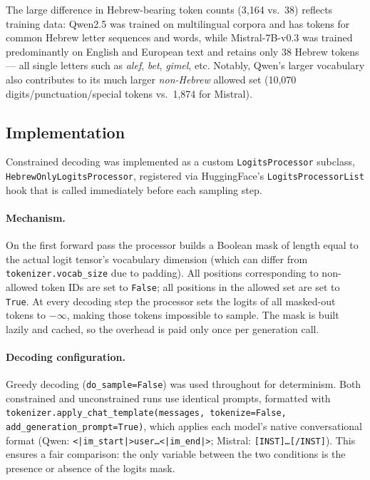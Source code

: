 \documentclass[11pt, a4paper]{article}
\begin{document}
The large difference in Hebrew-bearing token counts (3,164 vs.\ 38) reflects
training data: Qwen2.5 was trained on multilingual corpora and has tokens for
common Hebrew letter sequences and words, while Mistral-7B-v0.3 was trained
predominantly on English and European text and retains only 38 Hebrew tokens ---
all single letters such as \textit{alef}, \textit{bet}, \textit{gimel}, etc.
Notably, Qwen's larger vocabulary also contributes to its much larger
\emph{non-Hebrew} allowed set (10,070 digits/punctuation/special tokens vs.\
1,874 for Mistral).

\subsection{Implementation}

Constrained decoding was implemented as a custom \texttt{LogitsProcessor} subclass,
\texttt{HebrewOnlyLogitsProcessor}, registered via HuggingFace's
\texttt{LogitsProcessorList} hook that is called immediately before each
sampling step.

\paragraph{Mechanism.}
On the first forward pass the processor builds a Boolean mask of length equal to
the actual logit tensor's vocabulary dimension (which can differ from
\texttt{tokenizer.vocab\_size} due to padding).
All positions corresponding to non-allowed token IDs are set to \texttt{False};
all positions in the allowed set are set to \texttt{True}.
At every decoding step the processor sets the logits of all masked-out tokens to
$-\infty$, making those tokens impossible to sample.
The mask is built lazily and cached, so the overhead is paid only once per
generation call.

\paragraph{Decoding configuration.}
Greedy decoding (\texttt{do\_sample=False}) was used throughout for
determinism.
Both constrained and unconstrained runs use identical prompts, formatted with
\texttt{tokenizer.apply\_chat\_template(messages, tokenize=False,}
\texttt{add\_generation\_prompt=True)}, which applies each model's native
conversational format (Qwen: \texttt{<|im\_start|>user\ldots<|im\_end|>};
Mistral: \texttt{[INST]\ldots[/INST]}).
This ensures a fair comparison: the only variable between the two conditions is
the presence or absence of the logits mask.
\end{document}
